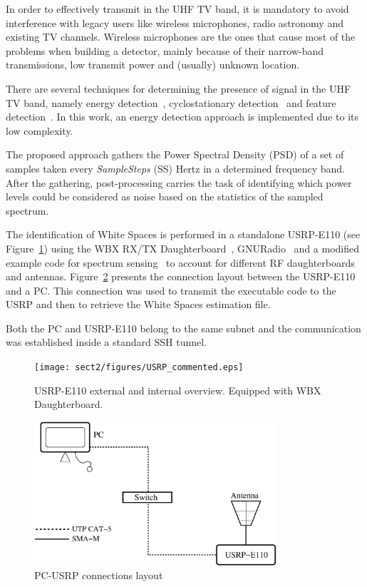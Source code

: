 In order to effectively transmit in the UHF TV band, it is mandatory to avoid interference with legacy users like wireless microphones, radio astronomy and existing TV channels. Wireless microphones are the ones that cause most of the problems when building a detector, mainly because of their narrow-band transmissions, low transmit power and (usually) unknown location. 

There are several techniques for determining the presence of signal in the UHF TV band, namely energy detection~\cite{cabric2006experimental}, cyclostationary detection~\cite{kim2007cyclostationary} and feature detection~\cite{cabric2006spectrum}. In this work, an energy detection approach is implemented due to its low complexity.

The proposed approach gathers the Power Spectral Density (PSD) of a set of samples taken every \emph{SampleSteps} (SS) Hertz in a determined frequency band. After the gathering, post-processing carries the task of identifying which power levels could be considered as noise based on the statistics of the sampled spectrum.

The identification of White Spaces is performed in a standalone USRP-E110 (see Figure~\ref{fig:usrp_combined}) using the WBX RX/TX Daughterboard~\cite{ettusWBX}, GNURadio~\cite{GNURadio} and a modified example code for spectrum sensing~\cite{sanabriaCodeUSRP} to account for different RF daughterboards and antennas. Figure~\ref{fig:connections} presents the connection layout between the USRP-E110 and a PC. This connection was used to transmit the executable code to the USRP and then to retrieve the White Spaces estimation file.

Both the PC and USRP-E110 belong to the same subnet and the communication was established inside a standard SSH tunnel.

\begin{figure}[htbp]
  \centering
  \texttt{[image: sect2/figures/USRP\_commented.eps]}
  \caption{USRP-E110 external and internal overview. Equipped with WBX Daughterboard.}
  \label{fig:usrp_combined}
\end{figure}

\begin{figure}[htbp]
  \centering
  \includegraphics[width = 9cm]{sect2/figures/connections.eps}
  \caption{PC-USRP connections layout}
  \label{fig:connections}
\end{figure}